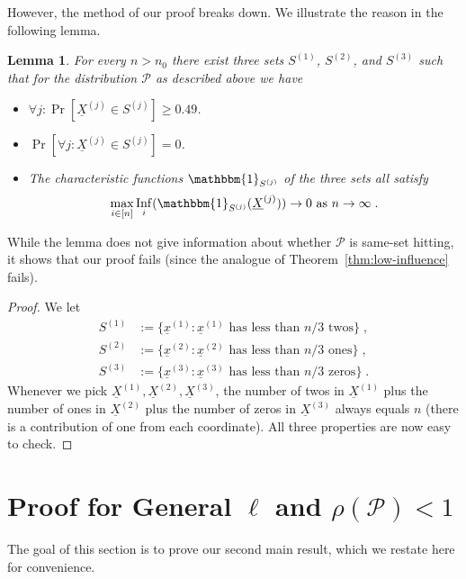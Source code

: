 \documentclass{daj}
\newcommand{\1}{\mathbbm{1}}
\theoremstyle{plain}
\newtheorem{lemma}[theorem]{Lemma}
\theoremstyle{definition}
\DeclareMathOperator{\Inf}{Inf}
\begin{document}
However, the method of our proof breaks down. 
We illustrate the reason in the following lemma.
\begin{lemma}\label{lem:threeSetFail}
For every $n > n_0$ there exist three sets $S^{(1)}$, $S^{(2)}$, and $S^{(3)}$ such 
that for
the distribution $\mathcal{P}$ as described above we have
\begin{itemize}
\item $\forall j: \Pr[ \underline{X}^{(j)} \in S^{(j)} ] \geq 0.49$.
\item $\Pr[\forall j: \underline{X}^{(j)} \in S^{(j)}] = 0$.
\item The characteristic functions $\1_{S^{(j)}}$ of the three sets all
satisfy
\begin{align*}
\max_{i \in [n]} \Inf_{i}(\1_{S^{(j)}}(\underline{X}^{(j)})) \to 0
\text{ as } n \to \infty \; .
\end{align*}
\end{itemize}
\end{lemma}
While the lemma does not give information about whether $\mathcal{P}$ is
same-set hitting, it shows that
our proof fails (since the analogue of Theorem~\ref{thm:low-influence}
fails).
\begin{proof}
We let 
\begin{align*}
S^{(1)} &:= \{\underline{x}^{(1)} : \text{$\underline{x}^{(1)}$ has 
less than $n/3$ twos}\}\;,\\
S^{(2)} &:= \{\underline{x}^{(2)} : \text{$\underline{x}^{(2)}$ has 
less than $n/3$ ones}\}\;,\\
S^{(3)} &:= \{\underline{x}^{(3)} : \text{$\underline{x}^{(3)}$ has 
less than $n/3$ zeros}\}\;.
\end{align*}
Whenever we pick
$\underline{X}^{(1)}, \underline{X}^{(2)}, \underline{X}^{(3)}$, the number of
twos in $\underline{X}^{(1)}$ plus the number of ones in $\underline{X}^{(2)}$
plus the number of zeros in $\underline{X}^{(3)}$ always equals $n$ (there is a
contribution of one from each coordinate).  All three properties are now easy to
check.
\end{proof}

\section{Proof for General
\texorpdfstring{$\ell$}{l}
and
\texorpdfstring{$\rho(\mathcal{P}) < 1$}{rho(P) < 1}}
\label{sec:main-proof}

The goal of this section is to prove our second main result, which we
restate here for convenience.
\end{document}

